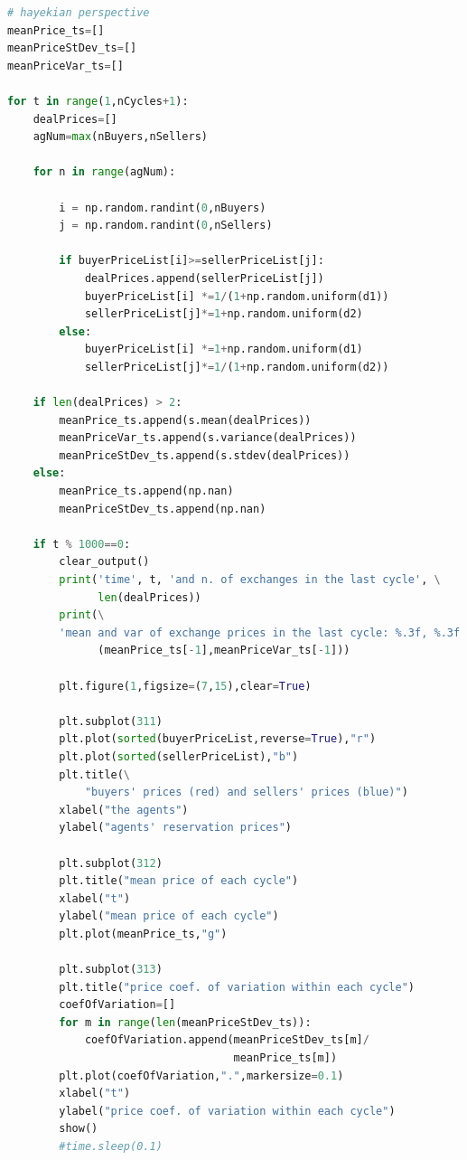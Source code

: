 \documentclass[12pt]{report}
\begin{document}
\begin{lstlisting}[language=Python, caption=The model in the hayekian perspective, basicstyle=\ttfamily\footnotesize]
# hayekian perspective
meanPrice_ts=[]
meanPriceStDev_ts=[]
meanPriceVar_ts=[]

for t in range(1,nCycles+1):    
    dealPrices=[]
    agNum=max(nBuyers,nSellers)

    for n in range(agNum):

        i = np.random.randint(0,nBuyers)
        j = np.random.randint(0,nSellers)
        
        if buyerPriceList[i]>=sellerPriceList[j]:
            dealPrices.append(sellerPriceList[j])
            buyerPriceList[i] *=1/(1+np.random.uniform(d1))
            sellerPriceList[j]*=1+np.random.uniform(d2)
        else:
            buyerPriceList[i] *=1+np.random.uniform(d1)
            sellerPriceList[j]*=1/(1+np.random.uniform(d2))
           
    if len(dealPrices) > 2:
        meanPrice_ts.append(s.mean(dealPrices))
        meanPriceVar_ts.append(s.variance(dealPrices))
        meanPriceStDev_ts.append(s.stdev(dealPrices))
    else:
        meanPrice_ts.append(np.nan)
        meanPriceStDev_ts.append(np.nan)

    if t % 1000==0:
        clear_output()
        print('time', t, 'and n. of exchanges in the last cycle', \
              len(dealPrices))
        print(\
        'mean and var of exchange prices in the last cycle: %.3f, %.3f' %\
              (meanPrice_ts[-1],meanPriceVar_ts[-1]))

        plt.figure(1,figsize=(7,15),clear=True)

        plt.subplot(311)
        plt.plot(sorted(buyerPriceList,reverse=True),"r")
        plt.plot(sorted(sellerPriceList),"b")
        plt.title(\
            "buyers' prices (red) and sellers' prices (blue)")
        xlabel("the agents")
        ylabel("agents' reservation prices")

        plt.subplot(312)
        plt.title("mean price of each cycle")
        xlabel("t")
        ylabel("mean price of each cycle")
        plt.plot(meanPrice_ts,"g")
        
        plt.subplot(313)
        plt.title("price coef. of variation within each cycle")
        coefOfVariation=[]
        for m in range(len(meanPriceStDev_ts)):
            coefOfVariation.append(meanPriceStDev_ts[m]/
                                   meanPrice_ts[m])
        plt.plot(coefOfVariation,".",markersize=0.1)
        xlabel("t")
        ylabel("price coef. of variation within each cycle")
        show()
        #time.sleep(0.1)


\end{lstlisting}
\end{document}
